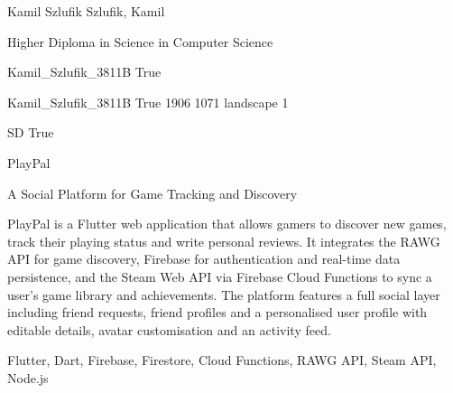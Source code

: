 \documentclass[twoside]{report}
\begin{document}
\begingroup{}\relax



\def\Key{Kamil_Szlufik_3811B}

{Kamil Szlufik}
{Szlufik, Kamil}

{Higher Diploma in Science in Computer Science}

{Kamil_Szlufik_3811B}
{True}

{Kamil_Szlufik_3811B}
{True}
{1906}
{1071}
{landscape}
{1}

{SD}
{True}

{PlayPal}

{A Social Platform for Game Tracking and Discovery}

{PlayPal is a Flutter web application that allows gamers to discover new games, track their playing status and write personal reviews. It integrates the RAWG API for game discovery, Firebase for authentication and real-time data persistence, and the Steam Web API via Firebase Cloud Functions to sync a user's game library and achievements. The platform features a full social layer including friend requests, friend profiles and a personalised user profile with editable details, avatar customisation and an activity feed.}

{Flutter, Dart, Firebase, Firestore, Cloud Functions, {RAWG} {API}, Steam {API}, Node.js}
\end{document}

